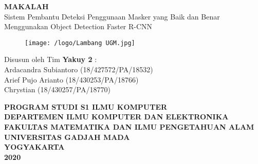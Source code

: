 \documentclass{article}
\begin{document}
  \begin{titlepage}
    \begin{center}
      
      \null
      {
      	\LARGE \bfseries MAKALAH}\\
      [0.5cm]
      {\Large Sistem Pembantu Deteksi Penggunaan Masker yang Baik dan Benar Menggunakan Object Detection Faster R-CNN}\\
          
      \vspace{2cm}

      \begin{figure}[H]
        \centering
        \texttt{[image: /logo/Lambang UGM.jpg]}
      \end{figure}
          
      \vspace{3cm}
    
      {\Large 
      Disusun oleh Tim \bfseries Yakuy 2} {\Large :\\
      \vspace{0.5cm}
      Ardacandra Subiantoro (18/427572/PA/18532)\\
      Arief Pujo Arianto (18/430253/PA/18766)\\
      Chrystian (18/430257/PA/18770)\\
      }


      \vspace{2cm}

      {\normalsize \bfseries
      PROGRAM STUDI S1 ILMU KOMPUTER\\
      DEPARTEMEN ILMU KOMPUTER DAN ELEKTRONIKA\\
      FAKULTAS MATEMATIKA DAN ILMU PENGETAHUAN ALAM\\
      UNIVERSITAS GADJAH MADA\\
      YOGYAKARTA\\
      \vspace{0.2cm}
      2020
      }
            
    \end{center}
  \end{titlepage}

\end{document}
